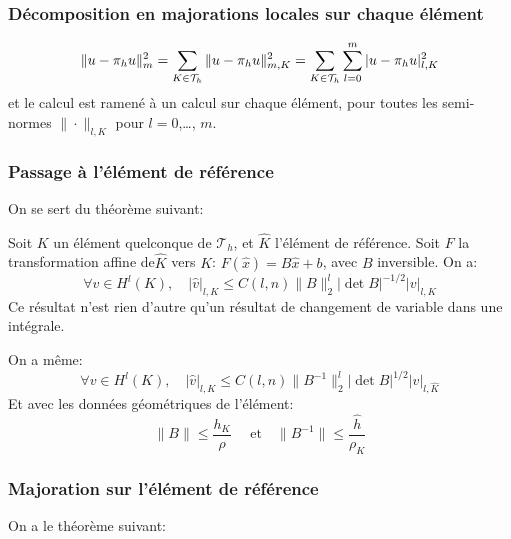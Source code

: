 \medskip
\subsubsection{Décomposition en majorations locales sur chaque élément}

\begin{equation}
\|u-\pi_hu\|^2_m=\displaystyle\sum_{K\in\mathcal{T}_h}\|u-\pi_hu\|^2_{m,K}=\displaystyle\sum_{K\in\mathcal{T}_h}\displaystyle\sum_{l=0}^m |u-\pi_hu|^2_{l,K}
\end{equation}
et le calcul est ramené à un calcul sur chaque élément, pour toutes les semi-normes
$\|\cdot\|_{l,K}$ pour $l=0$,\ldots, $m$.

\medskip
\subsubsection{Passage à l'élément de référence}

On se sert du théorème suivant:

\begin{theoreme}
Soit $K$ un élément quelconque de $\mathcal{T}_h$, et $\hat{K}$ l'élément de
référence. Soit $F$ la transformation affine de$\hat{K}$ vers $K$:
$F(\hat{x}) = B\hat{x} + b$, avec $B$ inversible. On a:
\begin{equation}
\forall v\in H^l(K), \quad
|\hat{v}|_{l,K} \le C(l,n) \|B\|_2^l |\det B|^{-1/2} |v|_{l,K}
\end{equation}
Ce résultat n'est rien d'autre qu'un résultat de changement de variable
dans une intégrale.
\end{theoreme}
On a même:
\begin{equation}
\forall v\in H^l(K), \quad
|\hat{v}|_{l,K} \le C(l,n) \|B^{-1}\|_2^l |\det B|^{1/2} |v|_{l,\hat{K}}
\end{equation}
\medskip
%
Et avec les données géométriques de l'élément:
\begin{equation}
\|B\|\le\dfrac{h_K}{\hat{\rho}} \quad\text{ et}\quad
\|B^{-1}\|\le\dfrac{\hat{h}}{\rho_K}
\end{equation}

\medskip
\subsubsection{Majoration sur l'élément de référence}
On a le théorème suivant:

